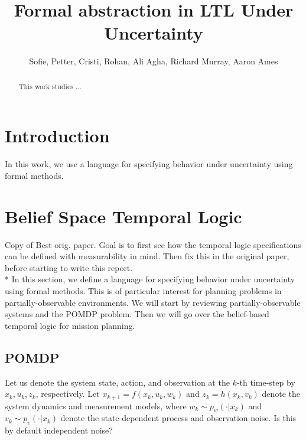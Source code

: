 \documentclass[conference]{IEEEtran}
\newcommand{\red}[1]{{\color{red} #1}}
\begin{document}

\title{\huge Formal abstraction in LTL Under Uncertainty}

\author{Sofie, Petter, Cristi, Rohan, Ali Agha, Richard Murray, Aaron Ames}

\maketitle

\begin{abstract}
This work studies ...
\end{abstract}

\IEEEpeerreviewmaketitle

	
\section{Introduction} \label{subsec:intro}
In this work, we use a language for specifying behavior under uncertainty using formal methods. 


	\section{Belief Space Temporal Logic}
	\red{Copy of Best orig. paper. Goal is to first see how the temporal logic specifications can be defined with measurability in mind. Then fix this in the original paper, before starting to write this report.\\*}
	In this section, we define a language for specifying behavior under uncertainty using formal methods. This is of particular interest for planning problems in partially-observable environments.
	 We will start by reviewing partially-observable systems and the POMDP problem. Then we will go over the belief-based temporal logic for mission planning.
	
	\subsection{POMDP}\label{sec:POMDP}
	Let us denote the system state, action, and observation at the $k$-th time-step by $x_k, u_k, z_k$, respectively. Let $x_{k+1}=f(x_k,u_k,w_k)$ and $z_k=h(x_k,v_k)$ denote the system dynamics and measurement models, where $w_k\sim p_w(\cdot|x_k)$ and $v_k\sim p_v(\cdot|x_k)$ denote the state-dependent process and observation noise.  \red{Is this by default independent noise?}
	
\end{document}
